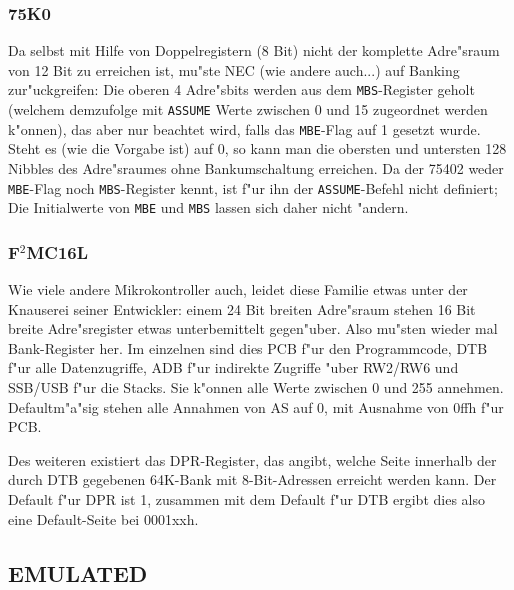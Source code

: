 \documentclass[12pt,a4paper,twoside]{report}
\makeatletter
\newcommand{\tty}[1]{{\tt #1}}
\newcommand{\ttindex}[1]{\index{#1@{\tt #1}}}
\makeatother
\begin{document}
{%

\subsubsection{75K0}

Da selbst mit Hilfe von Doppelregistern (8 Bit) nicht der komplette
Adre"sraum von 12 Bit zu erreichen ist, mu"ste NEC (wie andere auch...)
auf Banking zur"uckgreifen: Die oberen 4 Adre"sbits werden aus dem
\tty{MBS}-Register geholt (welchem demzufolge mit \tty{ASSUME} Werte
zwischen 0 und 15 zugeordnet werden k"onnen), das aber nur beachtet
wird, falls das \tty{MBE}-Flag auf 1 gesetzt wurde.  Steht es (wie
die Vorgabe ist) auf 0, so kann man die obersten und untersten 128
Nibbles des Adre"sraumes ohne Bankumschaltung erreichen.  Da der 75402
weder \tty{MBE}-Flag noch \tty{MBS}-Register kennt, ist f"ur ihn der
\tty{ASSUME}-Befehl nicht definiert; Die Initialwerte von \tty{MBE} und
\tty{MBS} lassen sich daher nicht "andern.


\subsubsection{F$^2$MC16L}

Wie viele andere Mikrokontroller auch, leidet diese Familie etwas unter
der Knauserei seiner Entwickler: einem 24 Bit breiten Adre"sraum stehen 16
Bit breite Adre"sregister etwas unterbemittelt gegen"uber.  Also mu"sten
wieder mal Bank-Register her.  Im einzelnen sind dies PCB f"ur den
Programmcode, DTB f"ur alle Datenzugriffe, ADB f"ur indirekte Zugriffe
"uber RW2/RW6 und SSB/USB f"ur die Stacks.  Sie k"onnen alle Werte
zwischen 0 und 255 annehmen.  Defaultm"a"sig stehen alle Annahmen von AS
auf 0, mit Ausnahme von 0ffh f"ur PCB.  

Des weiteren existiert das DPR-Register, das angibt, welche Seite
innerhalb der durch DTB gegebenen 64K-Bank mit 8-Bit-Adressen erreicht
werden kann.  Der Default f"ur DPR ist 1, zusammen mit dem Default f"ur
DTB ergibt dies also eine Default-Seite bei 0001xxh.


\subsection{EMULATED}
\ttindex{EMULATED}

}
\end{document}
